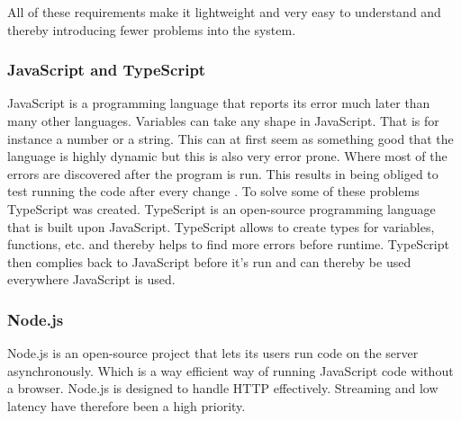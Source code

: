  
All of these requirements make it lightweight and very easy to understand and thereby introducing fewer problems into the system.  




\subsubsection{JavaScript and TypeScript}%
\label{ssub:JavaScript and TypeScript}

JavaScript is a programming language that reports its error much later than many other languages. Variables can take any shape in JavaScript. That is for instance a number or a string. This can at first seem as something good that the language is highly dynamic but this is also very error prone. Where most of the errors are discovered after the program is run. This results in being obliged to test running the code after every change \cite{taivalsaari2008web}. To solve some of these problems TypeScript was created. TypeScript is an open-source programming language that is built upon JavaScript. TypeScript allows to create types for variables, functions, etc. and thereby helps to find more errors before runtime. TypeScript then complies back to JavaScript before it's run and can thereby be used everywhere JavaScript is used.





\subsubsection{Node.js}%
\label{ssub:Node}
Node.js is an open-source project that lets its users run code on the server asynchronously. Which is a way efficient way of running JavaScript code without a browser. Node.js is designed to handle HTTP effectively. Streaming and low latency have therefore been a high priority.



